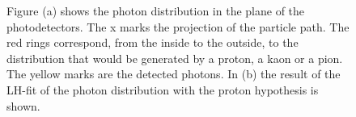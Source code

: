 \begin{figure}[!h]
  \centering
	\caption{Figure (a) shows the photon distribution in the plane of the photodetectors. The x marks the projection of the particle path. The red rings correspond, from the inside to the outside, to the distribution that would be generated by a proton, a kaon or a pion. The yellow marks are the detected photons. In (b) the result of the LH-fit of the photon distribution with the proton hypothesis is shown.}
	\label{pic:Photonfit}
\end{figure}

